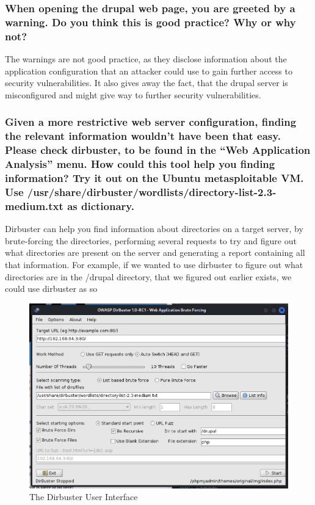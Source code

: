 \subsubsection{When opening the drupal web page, you are greeted by a warning. Do you think this is good practice? Why or why not?}
The warnings are not good practice, as they disclose information about the application configuration that an attacker could use to gain further access to security vulnerabilities. It also gives away the fact, that the drupal server is misconfigured and might give way to further security vulnerabilities.

\subsubsection{Given a more restrictive web server configuration, finding the relevant information wouldn't have been that easy. Please check dirbuster, to be found in the “Web Application Analysis” menu. How could this tool help you finding information? Try it out on the Ubuntu metasploitable VM. Use /usr/share/dirbuster/wordlists/directory-list-2.3-medium.txt as dictionary.}
Dirbuster can help you find information about directories on a target server, by brute-forcing the directories, performing several requests to try and figure out what directories are present on the server and generating a report containing all that information. For example, if we wanted to use dirbuster to figure out what directories are in the /drupal directory, that we figured out earlier exists, we could use dirbuster as so

\begin{figure}[H]
  \caption{The Dirbuster User Interface}
  \begin{center}
    \includegraphics[width=\textwidth]{Outputs/E05/dirbuster.png}
  \end{center}
\end{figure}


